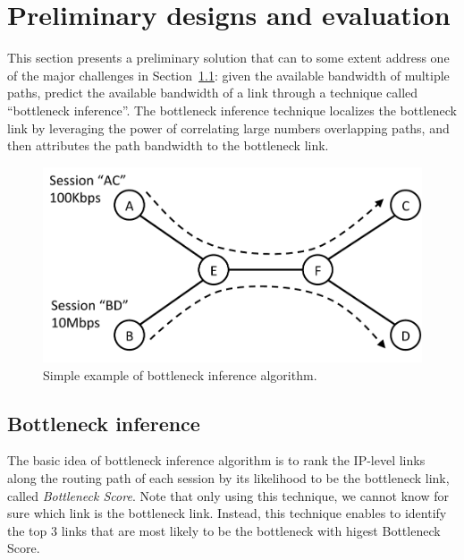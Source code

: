 \section{Preliminary designs and evaluation}

This section presents a preliminary solution that can to some extent address one of the major challenges in Section~\ref{}: given the available bandwidth of multiple paths, predict the available bandwidth of a link through a technique called ``bottleneck inference''.
The bottleneck inference technique localizes the bottleneck link by leveraging the power of correlating large numbers overlapping paths, and then attributes the path bandwidth to the bottleneck link. 

\begin{figure}[h]
\begin{center}
\includegraphics[scale=0.4] {figures/bottleneckExample.pdf}
\caption{Simple example of bottleneck inference algorithm.}
\label{fig:idea:example}
\end{center}
\end{figure}

\subsection{Bottleneck inference}
The basic idea of bottleneck inference algorithm is to rank the IP-level links along the routing path of each session by its likelihood to be the bottleneck link, called {\it Bottleneck Score}. Note that only using this technique, we cannot know for sure which link is the bottleneck link. Instead, this technique enables to identify the top 3 links that are most likely to be the bottleneck with higest Bottleneck Score. 

